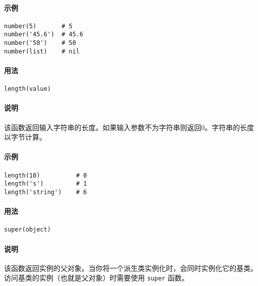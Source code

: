 \paragraph{示例}
\begin{lstlisting}[language=berry, numbers=none]
number(5)       # 5
number('45.6')  # 45.6
number('50')    # 50
number(list)    # nil
\end{lstlisting}


\paragraph{用法}
\begin{lstlisting}[language=berry, numbers=none]
length(value)
\end{lstlisting}

\paragraph{说明}
该函数返回输入字符串的长度。如果输入参数不为字符串则返回0。字符串的长度以字节计算。

\paragraph{示例}
\begin{lstlisting}[language=berry, numbers=none]
length(10)          # 0
length('s')         # 1
length('string')    # 6
\end{lstlisting}


\paragraph{用法}
\begin{lstlisting}[language=berry, numbers=none]
super(object)
\end{lstlisting}

\paragraph{说明}
该函数返回实例的父对象。当你将一个派生类实例化时，会同时实例化它的基类。访问基类的实例（也就是父对象）时需要使用 \texttt{super} 函数。

